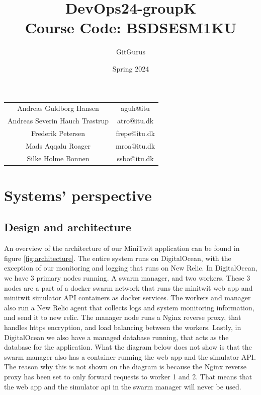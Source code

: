 \documentclass{article}
\title{DevOps24-groupK\\
\large Course Code: BSDSESM1KU}
\author{GitGurus}
\date{Spring 2024}
\begin{document}
\maketitle

\begin{table}[H]
    \centering
    \begin{tabular}{c|c}
    Andreas Guldborg Hansen & aguh@itu \\
    Andreas Severin Hauch Trøstrup & atro@itu.dk \\
    Frederik Petersen & frepe@itu.dk \\
    Mads Aqqalu Roager & mroa@itu.dk \\
    Silke Holme Bonnen & ssbo@itu.dk
    \end{tabular}
\end{table}

\newpage
\tableofcontents

\newpage


\section{Systems' perspective}
\subsection{Design and architecture}
An overview of the architecture of our MiniTwit application can be found in figure \ref{fig:architecture}. 
The entire system runs on DigitalOcean, with the exception of our monitoring and logging that runs on New Relic.
In DigitalOcean, we have 3 primary nodes running. A swarm manager, and two workers. These 3 nodes are a part of a docker swarm network that runs the minitwit web app and minitwit simulator API containers as docker services.
The workers and manager also run a New Relic agent that collects logs and system monitoring information, and send it to new relic.
The manager node runs a Nginx reverse proxy, that handles https encryption, and load balancing between the workers.
Lastly, in DigitalOcean we also have a managed database running, that acts as the database for the application.
What the diagram below does not show is that the swarm manager also has a container running the web app and the simulator API. The reason why this is not shown on the diagram is because the Nginx reverse proxy has been set to only forward requests to worker 1 and 2. 
That means that the web app and the simulator api in the swarm manager will never be used. 
\end{document}
